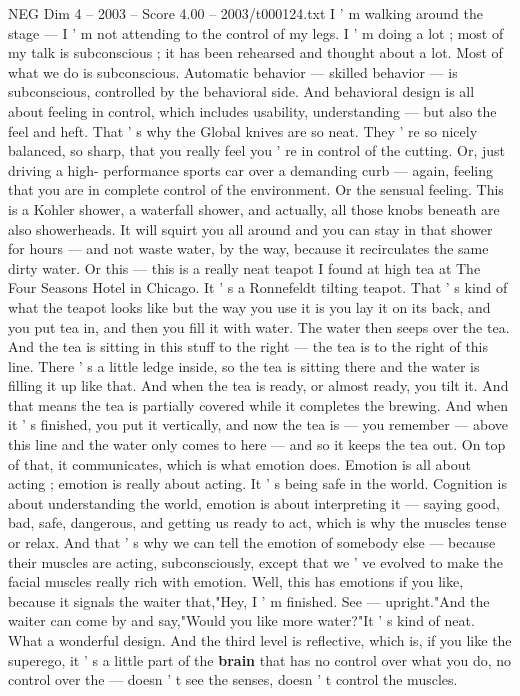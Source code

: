 \begin{textsample}{NEG Dim 4 – 2003 – Score 4.00 – 2003/t000124.txt}
I ' m walking around the stage — I ' m not attending to the control of my legs.
I ' m doing a lot ; most of my talk is subconscious ; it has been rehearsed and thought about a lot.
Most of what we do is subconscious.
Automatic behavior — skilled behavior — is subconscious, controlled by the behavioral side.
And behavioral design is all about feeling in control, which includes usability, understanding — but also the feel and heft.
That ' s why the Global knives are so neat.
They ' re so nicely balanced, so sharp, that you really feel you ' re in control of the cutting.
Or, just driving a high- performance sports car over a demanding curb — again, feeling that you are in complete control of the environment.
Or the sensual feeling.
This is a Kohler shower, a waterfall shower, and actually, all those knobs beneath are also showerheads.
It will squirt you all around and you can stay in that shower for hours — and not waste water, by the way, because it recirculates the same dirty water.
Or this — this is a really neat teapot I found at high tea at The Four Seasons Hotel in Chicago.
It ' s a Ronnefeldt tilting teapot.
That ' s kind of what the teapot looks like but the way you use it is you lay it on its back, and you put tea in, and then you fill it with water.
The water then seeps over the tea.
And the tea is sitting in this stuff to the right — the tea is to the right of this line.
There ' s a little ledge inside, so the tea is sitting there and the water is filling it up like that.
And when the tea is ready, or almost ready, you tilt it.
And that means the tea is partially covered while it completes the brewing.
And when it ' s finished, you put it vertically, and now the tea is — you remember — above this line and the water only comes to here — and so it keeps the tea out.
On top of that, it communicates, which is what emotion does.
Emotion is all about acting ; emotion is really about acting.
It ' s being safe in the world.
Cognition is about understanding the world, emotion is about interpreting it — saying good, bad, safe, dangerous, and getting us ready to act, which is why the muscles tense or relax.
And that ' s why we can tell the emotion of somebody else — because their muscles are acting, subconsciously, except that we ' ve evolved to make the facial muscles really rich with emotion.
Well, this has emotions if you like, because it signals the waiter that,"Hey, I ' m finished.
See — upright."And the waiter can come by and say,"Would you like more water?"It ' s kind of neat.
What a wonderful design.
And the third level is reflective, which is, if you like the superego, it ' s a little part of the \textbf{brain} that has no control over what you do, no control over the — doesn ' t see the senses, doesn ' t control the muscles.

\end{textsample}
